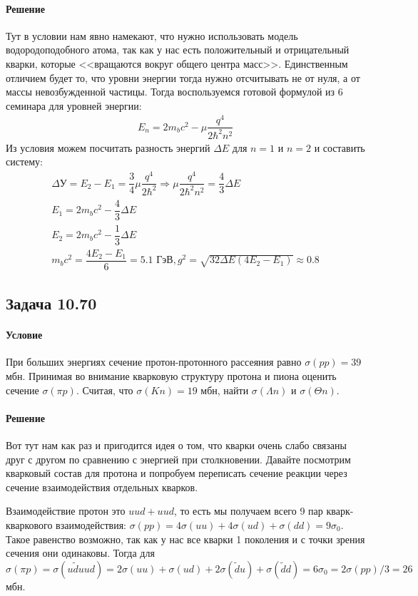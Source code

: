\documentclass[12pt]{article}
\begin{document}
\paragraph{Решение}
Тут в условии нам явно намекают, что нужно использовать модель водородоподобного атома, так как у нас есть положительный и отрицательный кварки, которые <<вращаются вокруг общего центра масс>>. Единственным отличием будет то, что уровни энергии тогда нужно отсчитывать не от нуля, а от массы невозбужденной частицы. Тогда воспользуемся готовой формулой из 6 семинара для уровней энергии:
\begin{gather*}
    E_n = 2m_bc^2 - \mu\dfrac{q^4}{2\hbar^2n^2}
\end{gather*}
Из условия можем посчитать разность энергий $\Delta E$ для $n=1$ и $n=2$ и составить систему:
\begin{gather*}
    \Delta У = E_2 - E_1 = \dfrac{3}{4}\mu\dfrac{q^4}{2\hbar^2} \Rightarrow \mu\dfrac{q^4}{2\hbar^2n^2} = \dfrac{4}{3}\Delta E\\
    E_1 = 2m_bc^2 - \dfrac{4}{3}\Delta E\\
    E_2 = 2m_bc^2 - \dfrac{1}{3}\Delta E\\
    m_bc^2 = \dfrac{4E_2-E_1}{6} = 5.1 \text{ ГэВ}, g^2=\sqrt{32\Delta E(4E_2-E_1)} \approx 0.8
\end{gather*}

\subsection{Задача 10.70}
\label{task_}
\paragraph{Условие}
При больших энергиях сечение протон-протонного рассеяния равно $\sigma(pp) = 39$ мбн. Принимая во внимание кварковую структуру протона и пиона оценить сечение $\sigma(\pi p)$. Считая, что $\sigma(Kn) = 19$ мбн, найти $\sigma(\Lambda n)$ и $\sigma(\Theta n)$.
\paragraph{Решение}
Вот тут нам как раз и пригодится идея о том, что кварки очень слабо связаны друг с другом по сравнению с энергией при столкновении. Давайте посмотрим кварковый состав для протона и попробуем переписать сечение реакции через сечение взаимодействия отдельных кварков. 

Взаимодействие протон это $uud + uud$, то есть мы получаем всего 9 пар кварк-кваркового взаимодействия: $\sigma(pp) = 4\sigma(uu)+ 4\sigma(ud) +\sigma(dd) = 9\sigma_0$. Такое равенство возможно, так как у нас все кварки 1 поколения и с точки зрения сечения они одинаковы. Тогда для $$\sigma(\pi p) = \sigma(u\widetilde{d} uud)=2\sigma(uu)+ \sigma(ud) + 2\sigma(\widetilde{d}u)+ \sigma(\widetilde{d}d) = 6\sigma_0 = 2\sigma(pp)/3 = 26$$ мбн.
\end{document}
